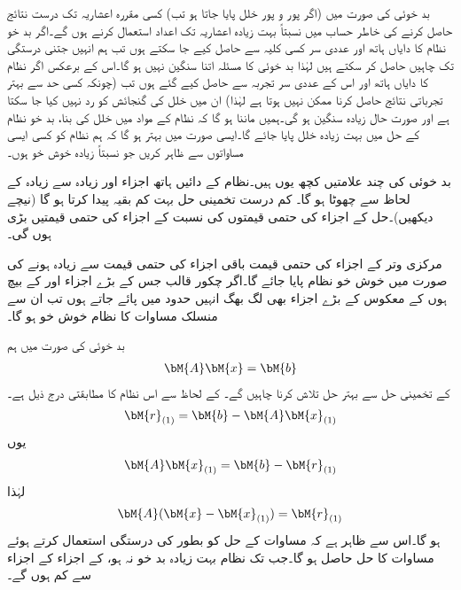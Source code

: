 بد خوئی کی صورت میں (اگر پور و پور خلل پایا جاتا ہو تب) کسی مقررہ اعشاریہ تک درست نتائج حاصل کرنے کی خاطر حساب میں نسبتاً بہت زیادہ اعشاریہ تک اعداد استعمال کرنے ہوں گے۔اگر بد خو نظام کا دایاں ہاتھ اور  عددی سر کسی کلیہ سے حاصل کیے جا سکتے ہوں تب ہم انہیں جتنی درستگی تک  چاہیں حاصل کر سکتے ہیں لہٰذا بد خوئی کا مسئلہ اتنا سنگین نہیں ہو گا۔اس کے برعکس اگر نظام کا دایاں ہاتھ اور اس کے عددی سر تجربہ سے حاصل کیے گئے ہوں تب (چونکہ کسی حد سے بہتر تجرباتی نتائج حاصل کرنا ممکن نہیں ہوتا ہے لہٰذا)   ان میں خلل کی گنجائش کو رد نہیں کیا جا سکتا ہے  اور صورت حال زیادہ سنگین ہو گی۔ہمیں ماننا  ہو گا کہ نظام کے مواد میں خلل کی بنا، بد خو نظام کے حل میں بہت زیادہ خلل پایا جائے گا۔ایسی صورت میں بہتر ہو گا کہ ہم نظام کو کسی ایسی مساواتوں سے ظاہر کریں جو نسبتاً زیادہ خوش خو ہوں۔

بد خوئی کی چند علامتیں کچھ یوں ہیں۔نظام کے دائیں ہاتھ اجزاء اور زیادہ سے زیادہ  کے لحاظ سے  چھوٹا ہو گا۔ کم درست تخمینی حل بہت کم  بقیہ پیدا کرتا ہو گا (نیچے دیکھیں)۔حل کے اجزاء کی حتمی قیمتوں کی نسبت  کے اجزاء کی حتمی قیمتیں بڑی ہوں گی۔ 

مرکزی وتر کے اجزاء کی حتمی قیمت باقی اجزاء کی حتمی قیمت سے زیادہ ہونے کی صورت میں خوش خو نظام پایا جائے گا۔اگر چکور قالب جس کے بڑے اجزاء  اور  کے بیچ ہوں کے معکوس کے بڑے اجزاء بھی لگ بھگ انہیں حدود میں پائے جاتے ہوں تب ان سے منسلک مساوات کا نظام خوش خو ہو گا۔ 

بد خوئی کی صورت میں ہم
\begin{align}\label{مساوات_خطی_اعدادی_نظام_بقیہ_الف}
\bM{A}\bM{x}=\bM{b}
\end{align}
کے تخمینی حل  سے  بہتر حل تلاش کرنا چاہیں گے۔  کے لحاظ سے اس نظام کا مطابقتی  درج ذیل ہے۔ 
\begin{align*}
\bM{r}_{(1)}=\bM{b}-\bM{A}\bM{x}_{(1)}
\end{align*}
یوں 
\begin{align*}
\bM{A}\bM{x}_{(1)}=\bM{b}-\bM{r}_{(1)}
\end{align*}
لہٰذا
\begin{align}\label{مساوات_خطی_اعدادی_نظام_بقیہ_ب}
\bM{A}(\bM{x}-\bM{x}_{(1)})=\bM{r}_{(1)}
\end{align}
ہو گا۔اس سے ظاہر ہے کہ مساوات  کے حل کو بطور   کی درستگی استعمال کرتے ہوئے مساوات  کا حل حاصل ہو گا۔جب تک نظام بہت زیادہ بد خو نہ ہو،  کے اجزاء  کے اجزاء سے کم ہوں گے۔

